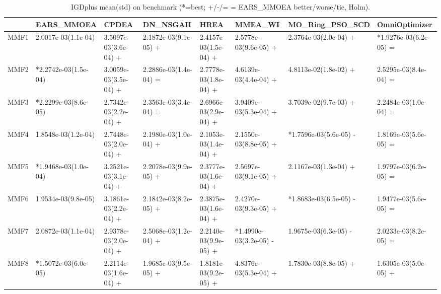 \begin{table}[t]
\centering
\caption{IGDplus mean(std) on benchmark (*=best; +/-/= = EARS_MMOEA better/worse/tie, Holm).}
\label{tab:benchmark_IGDplus}
\begin{tabular}{llllllll}
\toprule
 & EARS\_MMOEA & CPDEA & DN\_NSGAII & HREA & MMEA\_WI & MO\_Ring\_PSO\_SCD & OmniOptimizer \\
\midrule
MMF1 & 2.0017e-03(1.1e-04) & 3.5097e-03(3.6e-04) + & 2.1872e-03(9.1e-05) + & 2.4157e-03(1.5e-04) + & 2.5778e-03(9.6e-05) + & 2.3764e-03(2.0e-04) + & *1.9276e-03(6.2e-05) = \\
MMF2 & *2.2742e-03(1.5e-04) & 3.0059e-03(3.5e-04) + & 2.2886e-03(1.4e-04) = & 2.7778e-03(1.8e-04) + & 4.6139e-03(4.4e-04) + & 4.8113e-02(1.8e-02) + & 2.5295e-03(8.4e-04) = \\
MMF3 & *2.2299e-03(8.6e-05) & 2.7342e-03(2.2e-04) + & 2.3563e-03(3.4e-04) = & 2.6966e-03(2.9e-04) + & 3.9409e-03(5.3e-04) + & 3.7039e-02(9.7e-03) + & 2.2484e-03(1.0e-04) = \\
MMF4 & 1.8548e-03(1.2e-04) & 2.7448e-03(2.0e-04) + & 2.1980e-03(1.0e-04) + & 2.1053e-03(1.4e-04) + & 2.1550e-03(8.8e-05) + & *1.7596e-03(5.6e-05) - & 1.8169e-03(5.6e-05) = \\
MMF5 & *1.9468e-03(1.0e-04) & 3.2521e-03(3.1e-04) + & 2.2078e-03(9.9e-05) + & 2.3777e-03(1.6e-04) + & 2.5697e-03(9.1e-05) + & 2.1167e-03(1.3e-04) + & 1.9797e-03(6.2e-05) = \\
MMF6 & 1.9534e-03(9.8e-05) & 3.1861e-03(2.2e-04) + & 2.1842e-03(8.2e-05) + & 2.3875e-03(1.6e-04) + & 2.4270e-03(9.3e-05) + & *1.8683e-03(6.5e-05) - & 1.9477e-03(5.6e-05) = \\
MMF7 & 2.0872e-03(1.1e-04) & 2.9378e-03(2.0e-04) + & 2.5068e-03(1.2e-04) + & 2.2140e-03(9.9e-05) + & *1.4990e-03(3.2e-05) - & 1.9675e-03(6.3e-05) - & 2.0233e-03(8.2e-05) = \\
MMF8 & *1.5072e-03(6.0e-05) & 2.2114e-03(1.6e-04) + & 1.9685e-03(9.5e-05) + & 1.8181e-03(9.2e-05) + & 4.8376e-03(5.3e-04) + & 1.7830e-03(8.8e-05) + & 1.6305e-03(5.0e-05) + \\
\bottomrule
\end{tabular}
\end{table}
